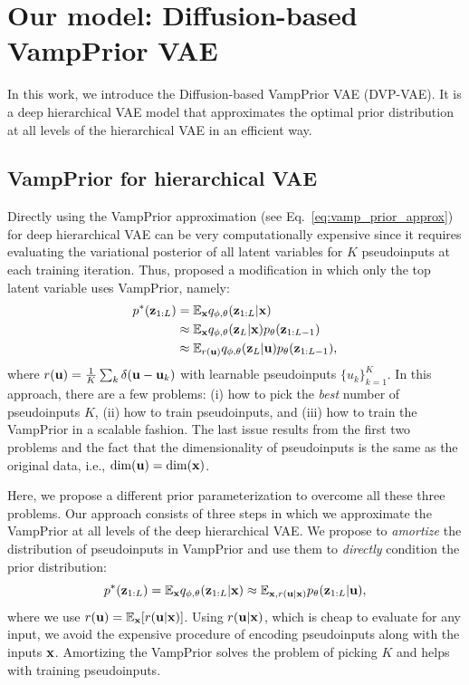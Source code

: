 
\section{Our model: Diffusion-based VampPrior VAE} \label{sec:proposed_approach}
In this work, we introduce the Diffusion-based VampPrior VAE (DVP-VAE). It is a deep hierarchical VAE model that approximates the optimal prior distribution at all levels of the hierarchical VAE in an efficient way.

\subsection{VampPrior for hierarchical VAE}
Directly using the VampPrior approximation (see Eq.~\ref{eq:vamp_prior_approx}) for deep hierarchical VAE can be very computationally expensive since it requires evaluating the variational posterior of all latent variables for $K$ pseudoinputs at each training iteration. Thus, \citet{tomczak2018vae} proposed a modification in which only the top latent variable uses VampPrior, namely:
\begin{equation}\label{eq:hierarchical_vamp}
\begin{aligned}
p^*(\rvz_{1:L}) &= \mathbb{E}_{\rvx} q_{\phi, \theta}(\rvz_{1:L}|\rvx) \\
&\approx \mathbb{E}_{\rvx} q_{\phi, \theta}(\rvz_{L}|\rvx) p_{\theta}(\rvz_{1:L-1})  \\
&\approx \mathbb{E}_{r(\rvu)} q_{\phi, \theta}(\rvz_{L}|\rvu) p_{\theta}(\rvz_{1:L-1}),
\end{aligned}
\end{equation}
where $r({\mathbf{u}}) = \frac1K \sum_k \delta({\mathbf{u}} - {\mathbf{u}}_k)$ with learnable pseudoinputs $\{u_k\}_{k=1}^K$.
In this approach, there are a few problems: (i) how to pick the \textit{best} number of pseudoinputs $K$, (ii) how to train pseudoinputs, and (iii) how to train the VampPrior in a scalable fashion. The last issue results from the first two problems and the fact that the dimensionality of pseudoinputs is the same as the original data, i.e., $\mathrm{dim}({\mathbf{u}}) = \mathrm{dim}({\mathbf{x}})$.

Here, we propose a different prior parameterization to overcome all these three problems. Our approach consists of three steps in which we approximate the VampPrior at all levels of the deep hierarchical VAE. 
We propose to \textit{amortize} the distribution of pseudoinputs in VampPrior and use them to \textit{directly} condition the prior distribution:
\begin{equation}\label{eq:our_vamp_prior}
p^*(\rvz_{1:L}) = \mathbb{E}_{\rvx} q_{\phi, \theta}(\rvz_{1:L}|\rvx) \approx \mathbb{E}_{\rvx, r(\rvu|\rvx)} p_{\theta}(\rvz_{1:L}|\rvu),
\end{equation}
where we use $r({\mathbf{u}}) = \mathbb{E}_{{\mathbf{x}}}[r({\mathbf{u}} | {\mathbf{x}})]$. Using $r({\mathbf{u}} | {\mathbf{x}})$, which is cheap to evaluate for any input, we avoid the expensive procedure of encoding pseudoinputs along with the inputs ${\mathbf{x}}$. Amortizing the VampPrior solves the problem of picking $K$ and helps with training pseudoinputs. 

